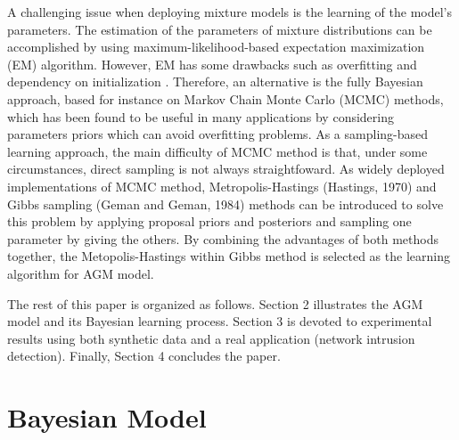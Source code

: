 \documentclass[conference]{llncs}
\begin{document}
A challenging issue when deploying mixture models is the learning of the model's parameters. The estimation of the parameters of mixture distributions can be accomplished by using maximum-likelihood-based expectation maximization (EM) \cite{b5} algorithm. However, EM has some drawbacks such as overfitting and dependency on initialization \cite{b6} \cite{b7}. Therefore, an alternative is the fully Bayesian approach, based for instance on Markov Chain Monte Carlo (MCMC) methods, which has been found to be useful in many applications by considering parameters priors which can avoid overfitting problems. As a sampling-based learning approach, the main difficulty of MCMC method is that, under some circumstances, direct sampling is not always straightfoward. As widely deployed implementations of MCMC method, Metropolis-Hastings (Hastings, 1970)\cite{b8} and Gibbs sampling (Geman and Geman, 1984)\cite{b9} methods can be introduced to solve this problem by applying proposal priors and posteriors and sampling one parameter by giving the others. By combining the advantages of both methods together, the Metopolis-Hastings within Gibbs method \cite{b6} is selected as the learning algorithm for AGM model.

The rest of this paper is organized as follows. Section 2 illustrates the AGM model and its Bayesian learning process. Section 3 is devoted to experimental results using both synthetic data and a real application (network intrusion detection). Finally, Section 4 concludes the paper.

\section{Bayesian Model}
\end{document}
